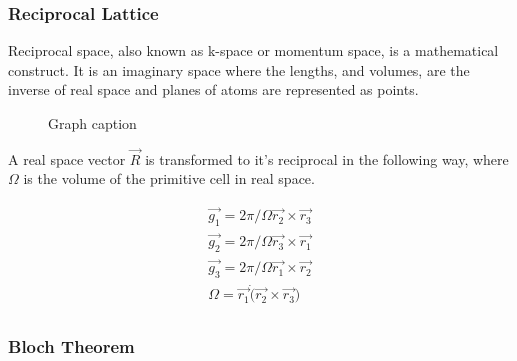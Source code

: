 \subsubsection{Reciprocal Lattice} 

Reciprocal space, also known as k-space or momentum space, is a mathematical construct.  It is an imaginary space where the lengths, and volumes, are the inverse of real space and planes of atoms are represented as points. 

\begin{figure}[htbp]
\begin{center}
\begin{minipage}{.4\textwidth}
\end{minipage}
\begin{minipage}{.1\textwidth}
\end{minipage}
\begin{minipage}{.4\textwidth}
\end{minipage}
\caption{Graph caption}
\label{graph:graph1}
\end{center}
\end{figure}

A real space vector $\vec{R}$ is transformed to it's reciprocal in the following way, where $\Omega$ is the volume of the primitive cell in real space.

\begin{equation}
  \begin{split}
    \vec{g_1} = {2 \pi} / {\Omega} \vec{r_2} \times \vec{r_3} \\
    \vec{g_2} = {2 \pi} / {\Omega} \vec{r_3} \times \vec{r_1} \\
    \vec{g_3} = {2 \pi} / {\Omega} \vec{r_1} \times \vec{r_2} \\
    \Omega = \vec{r_1} \dot (\vec{r_2} \times \vec{r_3}) \\
  \end{split}
  \label{eq:eqEulersFormula}
\end{equation}






\subsubsection{Bloch Theorem}


